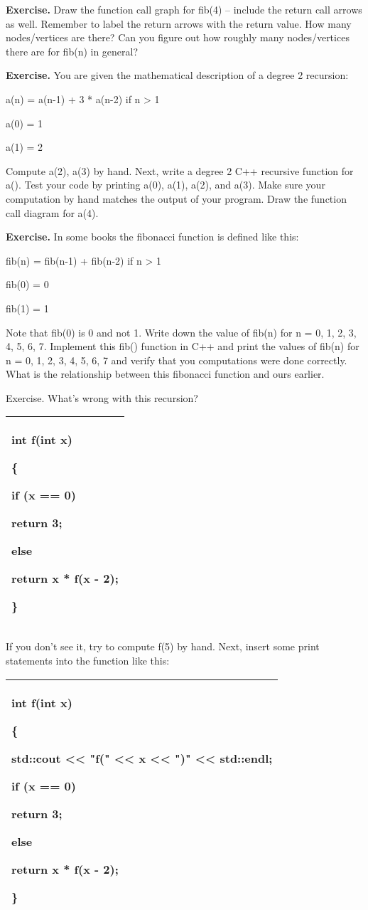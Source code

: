 \documentclass[
]{article}
\begin{document}
\textbf{Exercise.} Draw the function call graph for fib(4) -- include
the return call arrows as well. Remember to label the return arrows with
the return value. How many nodes/vertices are there? Can you figure out
how roughly many nodes/vertices there are for fib(n) in general?

\textbf{Exercise.} You are given the mathematical description of a
degree 2 recursion:

a(n) = a(n-1) + 3 * a(n-2) if n \textgreater{} 1

a(0) = 1

a(1) = 2

Compute a(2), a(3) by hand. Next, write a degree 2 C++ recursive
function for a(). Test your code by printing a(0), a(1), a(2), and a(3).
Make sure your computation by hand matches the output of your program.
Draw the function call diagram for a(4).

\textbf{Exercise.} In some books the fibonacci function is defined like
this:

fib(n) = fib(n-1) + fib(n-2) if n \textgreater{} 1

fib(0) = 0

fib(1) = 1

Note that fib(0) is 0 and not 1. Write down the value of fib(n) for n =
0, 1, 2, 3, 4, 5, 6, 7. Implement this fib() function in C++ and print
the values of fib(n) for n = 0, 1, 2, 3, 4, 5, 6, 7 and verify that you
computations were done correctly. What is the relationship between this
fibonacci function and ours earlier.

Exercise. What's wrong with this recursion?

\begin{longtable}[]{@{}l@{}}
\toprule
\endhead
\begin{minipage}[t]{0.97\columnwidth}\raggedright
int f(int x)

\{

if (x == 0)

return 3;

else

return x * f(x - 2);

\}\strut
\end{minipage}\tabularnewline
\bottomrule
\end{longtable}

If you don't see it, try to compute f(5) by hand. Next, insert some
print statements into the function like this:

\begin{longtable}[]{@{}l@{}}
\toprule
\endhead
\begin{minipage}[t]{0.97\columnwidth}\raggedright
int f(int x)

\{

std::cout \textless\textless{} "f(" \textless\textless{} x
\textless\textless{} ")" \textless\textless{} std::endl;

if (x == 0)

return 3;

else

return x * f(x - 2);

\}\strut
\end{minipage}\tabularnewline
\bottomrule
\end{longtable}
\end{document}
